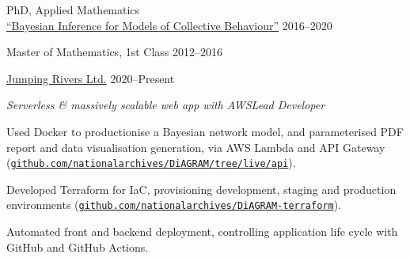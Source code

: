 \documentclass[12pt, a4paper]{article}
\begin{document}

\makecard





%
        {PhD, Applied Mathematics\\
         \href{https://jwalton.info/assets/thesis.pdf}%
              {{\footnotesize{}}``Bayesian Inference for Models of Collective Behaviour''}}%
        {2016--2020}

%
        {Master of Mathematics, 1st Class}%
        {2012--2016}




%
        {\href{https://www.jumpingrivers.com/}{Jumping Rivers Ltd.}}%
        {2020--Present}

\vspace{-1em}


%
       {\emph{Serverless \& massively scalable web app with AWS\hfill{}Lead Developer}

       \begin{adjustwidth}{0em}{3em}

       \sloppy{}Used Docker to productionise a Bayesian network model,
       and parameterised PDF report and data visualisation generation,
       via AWS Lambda and API Gateway
       (\href{https://github.com/nationalarchives/diagram/tree/live/api}%
             {\texttt{github.com/nationalarchives/DiAGRAM/tree/live/api}}).

       Developed Terraform for IaC, provisioning development, staging and production environments
       (\href{https://github.com/nationalarchives/DiAGRAM-terraform/}%
             {\texttt{github.com/nationalarchives/DiAGRAM-terraform}}).

       Automated front and backend deployment, controlling application life
       cycle with GitHub and GitHub Actions.

       \end{adjustwidth}}%
\end{document}
